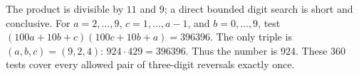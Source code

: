 The product is divisible by $11$ and $9$; a direct bounded digit search is short and conclusive. For $a=2,\ldots,9$, $c=1,\ldots,a-1$, and $b=0,\ldots,9$, test $(100a+10b+c)(100c+10b+a)=396396$. The only triple is $(a,b,c)=(9,2,4)$: $924\cdot429=396396$. Thus the number is $\boxed{924}$. These $360$ tests cover every allowed pair of three-digit reversals exactly once.
